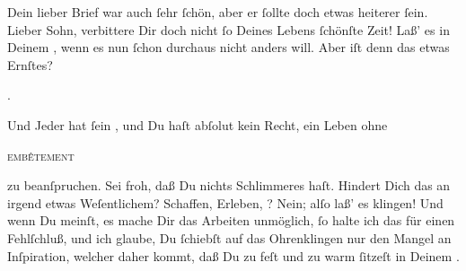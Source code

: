 \pstart
           Dein lieber Brief war auch{ }ſehr{ }ſchön, aber er{ }ſollte doch etwas heiterer{ }ſein.
               Lieber Sohn, verbittere  Dir
               doch nicht{ }ſo Deines Lebens{ }ſchönſte Zeit! Laß’ es in Deinem \label{K_L02839-3v}\label{K_L02839-3}, wenn es nun{ }ſchon durchaus nicht anders will. Aber iſt denn das {\pb}etwas Ernſtes? 
               \begin{otherlanguage}{french}\textsc{\label{K_L02839-4v}\label{K_L02839-4}.}\end{otherlanguage}
                Und Jeder hat{ }ſein \label{K_L02839-5v}\label{K_L02839-5},
               und Du haſt abſolut kein Recht, ein Leben ohne \begin{otherlanguage}{french}\textsc{embêtement}\end{otherlanguage}{ }zu beanſpruchen. Sei froh, daß Du nichts
               Schlimmeres haſt. Hindert Dich das an irgend etwas Weſentlichem? Schaffen, Erleben,
                  \label{K_L02839-6v}\label{K_L02839-6}? Nein;
               alſo laß’ \strikeout{\textcolor{gray}{×}} es klingen! Und wenn Du meinſt, es mache Dir das Arbeiten unmöglich,{ }ſo  halte ich das für einen Fehlſchluß, und ich
               glaube, Du{ }ſchiebſt auf das Ohrenklingen nur  den  Mangel an Inſpiration, welcher daher
               kommt, daß Du zu feſt und zu warm{ }ſitzeſt in Deinem \label{K_L02839-7v}\label{K_L02839-7}.\pend
           
